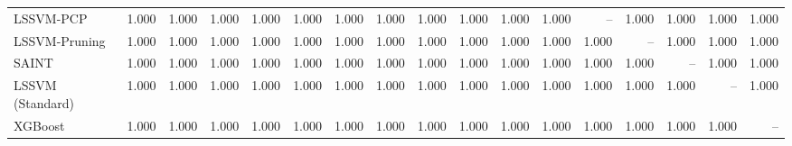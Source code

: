 \begin{table}[ht]
{\begin{tabular}{lrrrrrrrrrrrrrrrr}
LSSVM-PCP & 1.000 & 1.000 & 1.000 & 1.000 & 1.000 & 1.000 & 1.000 & 1.000 & 1.000 & 1.000 & 1.000 & -- & 1.000 & 1.000 & 1.000 & 1.000 \\
LSSVM-Pruning & 1.000 & 1.000 & 1.000 & 1.000 & 1.000 & 1.000 & 1.000 & 1.000 & 1.000 & 1.000 & 1.000 & 1.000 & -- & 1.000 & 1.000 & 1.000 \\
SAINT & 1.000 & 1.000 & 1.000 & 1.000 & 1.000 & 1.000 & 1.000 & 1.000 & 1.000 & 1.000 & 1.000 & 1.000 & 1.000 & -- & 1.000 & 1.000 \\
LSSVM (Standard) & 1.000 & 1.000 & 1.000 & 1.000 & 1.000 & 1.000 & 1.000 & 1.000 & 1.000 & 1.000 & 1.000 & 1.000 & 1.000 & 1.000 & -- & 1.000 \\
XGBoost & 1.000 & 1.000 & 1.000 & 1.000 & 1.000 & 1.000 & 1.000 & 1.000 & 1.000 & 1.000 & 1.000 & 1.000 & 1.000 & 1.000 & 1.000 & -- \\
    \bottomrule
  \end{tabular}}
\end{table}